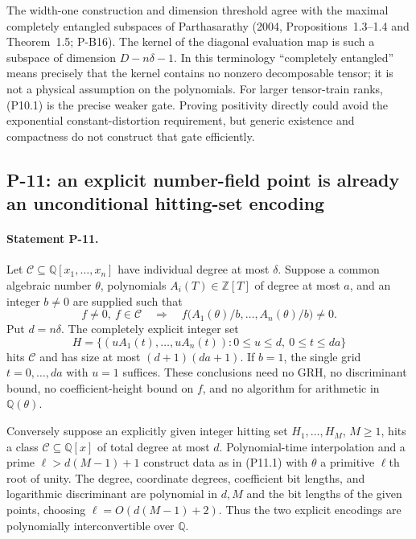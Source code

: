 The width-one construction and dimension threshold agree with the maximal completely entangled subspaces of Parthasarathy (2004, Propositions~1.3--1.4 and Theorem~1.5; P-B16). The kernel of the diagonal evaluation map is such a subspace of dimension $D-n\delta-1$. In this terminology ``completely entangled'' means precisely that the kernel contains no nonzero decomposable tensor; it is not a physical assumption on the polynomials. For larger tensor-train ranks, (P10.1) is the precise weaker gate. Proving positivity directly could avoid the exponential constant-distortion requirement, but generic existence and compactness do not construct that gate efficiently.

\subsection{P-11: an explicit number-field point is already an unconditional hitting-set encoding}
\paragraph{Statement P-11.}
Let $\mathcal C\subseteq\mathbb Q[x_1,\ldots,x_n]$ have individual degree at most $\delta$. Suppose a common algebraic number $\theta$, polynomials $A_i(T)\in\mathbb Z[T]$ of degree at most $a$, and an integer $b\ne0$ are supplied such that
\[
 f\ne0,\ f\in\mathcal C\quad\Longrightarrow\quad
 f\bigl(A_1(\theta)/b,\ldots,A_n(\theta)/b\bigr)\ne0.
 \tag{P11.1}
\]
Put $d=n\delta$. The completely explicit integer set
\[
 H=\{(uA_1(t),\ldots,uA_n(t)):
        0\le u\le d,\ 0\le t\le da\}
 \tag{P11.2}
\]
hits $\mathcal C$ and has size at most $(d+1)(da+1)$. If $b=1$, the single grid $t=0,\ldots,da$ with $u=1$ suffices. These conclusions need no GRH, no discriminant bound, no coefficient-height bound on $f$, and no algorithm for arithmetic in $\mathbb Q(\theta)$.

Conversely suppose an explicitly given integer hitting set $H_1,\ldots,H_M$, $M\ge1$, hits a class $\mathcal C\subseteq\mathbb Q[x]$ of total degree at most $d$. Polynomial-time interpolation and a prime $\ell>d(M-1)+1$ construct data as in (P11.1) with $\theta$ a primitive $\ell$th root of unity. The degree, coordinate degrees, coefficient bit lengths, and logarithmic discriminant are polynomial in $d,M$ and the bit lengths of the given points, choosing $\ell=O(d(M-1)+2)$. Thus the two explicit encodings are polynomially interconvertible over $\mathbb Q$.
